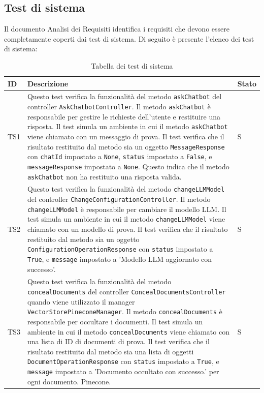 \documentclass[10pt, a4paper]{article}
\begin{document}
\subsection{Test di sistema}
Il documento Analisi dei Requisiti identifica i requisiti che devono essere completamente coperti dai test di sistema. Di seguito è presente l'elenco dei test di sistema:
\renewcommand{\arraystretch}{1.5}
\begin{xltabular}{\textwidth}{p{0.12\textwidth}|X|p{0.12\textwidth}}

    \caption{Tabella dei test di sistema}
    \label{tab:test_sistema}\\
    \textbf{ID} & \textbf{Descrizione} & \textbf{Stato}  \\
    \hline
    
    TS1 & Questo test verifica la funzionalità del metodo \texttt{askChatbot} del controller \texttt{AskChatbotController}. Il metodo \texttt{askChatbot} è responsabile per gestire le richieste dell'utente e restituire una risposta. Il test simula un ambiente in cui il metodo \texttt{askChatbot} viene chiamato con un messaggio di prova. Il test verifica che il risultato restituito dal metodo sia un oggetto \texttt{MessageResponse} con \texttt{chatId} impostato a \texttt{None}, \texttt{status} impostato a \texttt{False}, e \texttt{messageResponse} impostato a \texttt{None}. Questo indica che il metodo \texttt{askChatbot} non ha restituito una risposta valida.  & S \\
    \hline
    TS2 & Questo test verifica la funzionalità del metodo \texttt{changeLLMModel} del controller \texttt{ChangeConfigurationController}. Il metodo \texttt{changeLLMModel} è responsabile per cambiare il modello LLM. Il test simula un ambiente in cui il metodo \texttt{changeLLMModel} viene chiamato con un modello di prova. Il test verifica che il risultato restituito dal metodo sia un oggetto \texttt{ConfigurationOperationResponse} con \texttt{status} impostato a \texttt{True}, e \texttt{message} impostato a 'Modello LLM aggiornato con successo'.  & S \\
    \hline
    TS3 & Questo test verifica la funzionalità del metodo \texttt{concealDocuments} del controller \texttt{ConcealDocumentsController} quando viene utilizzato il manager \texttt{VectorStorePineconeManager}. Il metodo \texttt{concealDocuments} è responsabile per occultare i documenti. Il test simula un ambiente in cui il metodo \texttt{concealDocuments} viene chiamato con una lista di ID di documenti di prova. Il test verifica che il risultato restituito dal metodo sia una lista di oggetti \texttt{DocumentOperationResponse} con \texttt{status} impostato a \texttt{True}, e \texttt{message} impostato a 'Documento occultato con successo.' per ogni documento. Pinecone.  & S \\

\end{xltabular}
\end{document}

